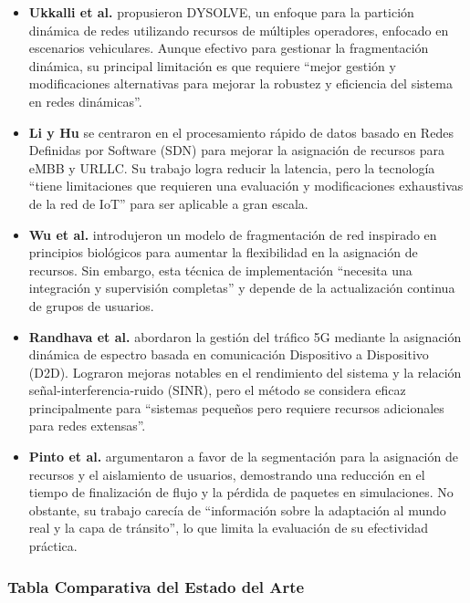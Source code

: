 \documentclass[12pt,a4paper]{article}
\begin{document}
\begin{itemize}
    \item \textbf{Ukkalli et al.} propusieron DYSOLVE, un enfoque para la partición dinámica de redes utilizando recursos de múltiples operadores, enfocado en escenarios vehiculares. Aunque efectivo para gestionar la fragmentación dinámica, su principal limitación es que requiere ``mejor gestión y modificaciones alternativas para mejorar la robustez y eficiencia del sistema en redes dinámicas''.
    
    \item \textbf{Li y Hu} se centraron en el procesamiento rápido de datos basado en Redes Definidas por Software (SDN) para mejorar la asignación de recursos para eMBB y URLLC. Su trabajo logra reducir la latencia, pero la tecnología ``tiene limitaciones que requieren una evaluación y modificaciones exhaustivas de la red de IoT'' para ser aplicable a gran escala.
    
    \item \textbf{Wu et al.} introdujeron un modelo de fragmentación de red inspirado en principios biológicos para aumentar la flexibilidad en la asignación de recursos. Sin embargo, esta técnica de implementación ``necesita una integración y supervisión completas'' y depende de la actualización continua de grupos de usuarios.
    
    \item \textbf{Randhava et al.} abordaron la gestión del tráfico 5G mediante la asignación dinámica de espectro basada en comunicación Dispositivo a Dispositivo (D2D). Lograron mejoras notables en el rendimiento del sistema y la relación señal-interferencia-ruido (SINR), pero el método se considera eficaz principalmente para ``sistemas pequeños pero requiere recursos adicionales para redes extensas''.
    
    \item \textbf{Pinto et al.} argumentaron a favor de la segmentación para la asignación de recursos y el aislamiento de usuarios, demostrando una reducción en el tiempo de finalización de flujo y la pérdida de paquetes en simulaciones. No obstante, su trabajo carecía de ``información sobre la adaptación al mundo real y la capa de tránsito'', lo que limita la evaluación de su efectividad práctica.
\end{itemize}

\subsubsection{Tabla Comparativa del Estado del Arte}
\end{document}
